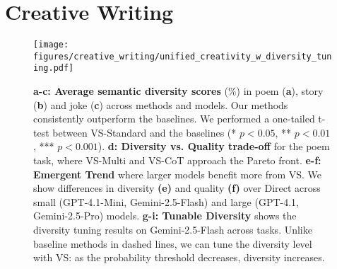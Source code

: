 \section{Creative Writing}\label{sec:creative_writing}
\begin{figure}[t]
    \centering
    \texttt{[image: figures/creative\_writing/unified\_creativity\_w\_diversity\_tuning.pdf]}
    \caption{
    \textbf{a-c: Average semantic diversity scores} (\%) in poem  (\textbf{a}), story (\textbf{b}) and joke (\textbf{c}) across methods and models. Our methods consistently outperform the baselines. We performed a one-tailed t-test between VS-Standard and the baselines (* $p<0.05$, ** $p<0.01$, *** $p<0.001$). 
    \textbf{d: Diversity vs. Quality trade-off} for the poem task, where VS-Multi and VS-CoT approach the Pareto front. \textbf{e-f: Emergent Trend} where larger models benefit more from VS. We show differences in diversity \textbf{(e)} and quality \textbf{(f)} over Direct across small (GPT-4.1-Mini, Gemini-2.5-Flash) and large (GPT-4.1, Gemini-2.5-Pro) models. 
    \textbf{g-i: Tunable Diversity} shows the diversity tuning results on Gemini-2.5-Flash across tasks. Unlike baseline methods in dashed lines, we can tune the diversity level with VS: as the probability threshold decreases, diversity increases.
}
\end{figure}
